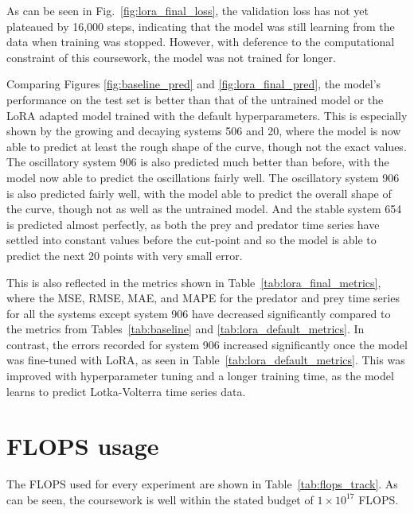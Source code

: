 \documentclass[11pt,a4paper]{article}
\begin{document}
As can be seen in Fig.~\ref{fig:lora_final_loss}, the validation loss has not yet plateaued by 16,000 steps, indicating that the model was still learning from the data when training was stopped. However, with deference to the computational constraint of this coursework, the model was not trained for longer.

Comparing Figures \ref{fig:baseline_pred} and \ref{fig:lora_final_pred}, the model's performance on the test set is better than that of the untrained model or the LoRA adapted model trained with the default hyperparameters. This is especially shown by the growing and decaying systems 506 and 20, where the model is now able to predict at least the rough shape of the curve, though not the exact values. The oscillatory system 906 is also predicted much better than before, with the model now able to predict the oscillations fairly well. The oscillatory system 906 is also predicted fairly well, with the model able to predict the overall shape of the curve, though not as well as the untrained model. And the stable system 654 is predicted almost perfectly, as both the prey and predator time series have settled into constant values before the cut-point and so the model is able to predict the next 20 points with very small error.

This is also reflected in the metrics shown in Table~\ref{tab:lora_final_metrics}, where the MSE, RMSE, MAE, and MAPE for the predator and prey time series for all the systems except system 906 have decreased significantly compared to the metrics from Tables~\ref{tab:baseline} and \ref{tab:lora_default_metrics}. In contrast, the errors recorded for system 906 increased significantly once the model was fine-tuned with LoRA, as seen in Table~\ref{tab:lora_default_metrics}. This was improved with hyperparameter tuning and a longer training time, as the model learns to predict Lotka-Volterra time series data. 

\section{FLOPS usage}

The FLOPS used for every experiment are shown in Table~\ref{tab:flops_track}. As can be seen, the coursework is well within the stated budget of $1 \times 10^{17}$ FLOPS.
\end{document}
